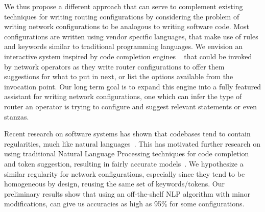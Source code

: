 

We thus propose a different approach that can serve to complement existing techniques for writing routing configurations by considering the problem of writing network configurations to be analogous to writing software code. Most configurations are written using vendor specific languages, that make use of rules and keywords similar to traditional programming languages. We envision an interactive system inspired by code completion engines ~\cite{raychev, intelliJ-completion} that could be invoked by network operators as they write router configurations to offer them suggestions for what to put in next, or list the options available from the invocation point. Our long term goal is to expand this engine into a fully featured assistant for writing network configurations, one which can infer the type of router an operator is trying to configure and suggest relevant statements or even stanzas.

Recent research on software systems has shown that codebases tend to contain regularities, much like natural languages~\cite{naturalness}. This has motivated further research on using traditional Natural Language Processing techniques for code completion and token suggestion, resulting in fairly accurate models~\cite{naturalness, raychev}. We hypothesize a similar regularity for network configurations, especially since they tend to be homogeneous by design, reusing the same set of keywords/tokens. Our preliminary results show that using an off-the-shelf NLP algorithm with minor modifications, can give us accuracies as high as 95\% for some configurations.\\
